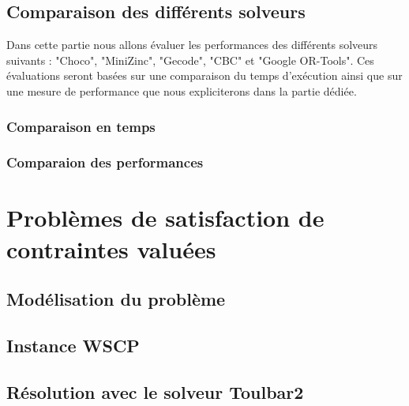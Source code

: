 \documentclass[12pt]{article}
\begin{document}
\subsection{Comparaison des différents solveurs}
Dans cette partie nous allons évaluer les performances des différents solveurs suivants : 
"Choco", "MiniZinc", "Gecode", "CBC" et "Google OR-Tools". Ces évaluations seront basées sur une comparaison du temps d'exécution ainsi
que sur une mesure de performance que nous expliciterons dans la partie dédiée.
\subsubsection{Comparaison en temps}
\subsubsection{Comparaion des performances}


\section{Problèmes de satisfaction de contraintes valuées}
\subsection{Modélisation du problème }
\subsection{Instance WSCP}
\subsection{Résolution avec le solveur Toulbar2}
\end{document}
